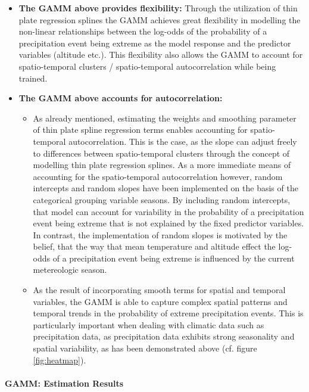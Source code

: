 \documentclass[
  12pt,
]{article}
\begin{document}
\begin{itemize}[label={}]
\item \textbf{The GAMM above provides flexibility:} Through the utilization of thin plate regression splines the GAMM achieves great flexibility in modelling the non-linear relationships between the log-odds of the probability of a precipitation event being extreme as the model response and the predictor variables (altitude etc.). This flexibility also allows the GAMM to account for spatio-temporal clusters / spatio-temporal autocorrelation while being trained. 
\item \textbf{The GAMM above accounts for autocorrelation:} 
\begin{itemize}
\item As already mentioned, estimating the weights and smoothing parameter of thin plate spline regression terms enables accounting for spatio-temporal autocorrelation. This is the case, as the slope can adjust freely to differences between spatio-temporal clusters through the concept of modelling thin plate regression splines. As a more immediate means of accounting for the spatio-temporal autocorrelation however, random intercepts and random slopes have been implemented on the basis of the categorical grouping variable seasons. By including random intercepts, that model can account for variability in the probability of a precipitation event being extreme that is not explained by the fixed predictor variables. In contrast, the implementation of random slopes is motivated by the belief, that the way that mean temperature and altitude effect the log-odds of a precipitation event being extreme is influenced by the current metereologic season.
\item As the result of incorporating smooth terms for spatial and
temporal variables, the GAMM is able to capture complex spatial patterns and temporal
trends in the probability of extreme precipitation events. This is particularly important when dealing with climatic data such as precipitation data, as precipitation data exhibits strong seasonality and spatial variability, as has been demonstrated above (cf. figure \ref{fig:heatmap}).
\end{itemize} 
\end{itemize}

\hypertarget{gamm-estimation-results}{%
\paragraph{\texorpdfstring{GAMM: Estimation Results
\newline}{GAMM: Estimation Results }}\label{gamm-estimation-results}}
\end{document}
